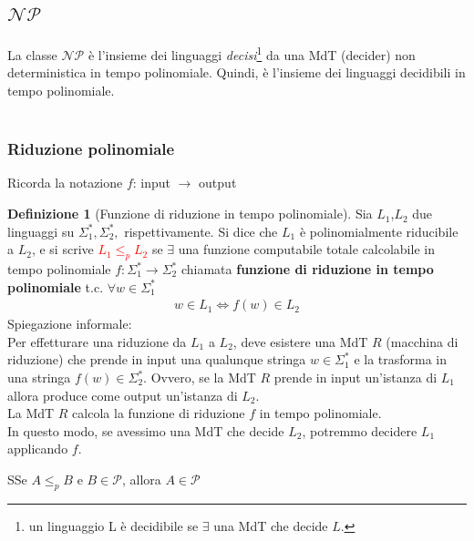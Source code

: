\documentclass{article}  %
\theoremstyle{definition}
\newtheorem{definition}{Definizione}[section]
\begin{document}
\subsection{$\mathcal{NP}$}
La classe $\mathcal{NP}$ è l'insieme dei linguaggi \textit{decisi}\footnote{un linguaggio L è decidibile se $\exists$ una MdT che decide $L$.} da una MdT (decider) non deterministica in tempo polinomiale.
Quindi, è l'insieme dei linguaggi decidibili in tempo polinomiale. \\ \\




















\subsubsection{Riduzione polinomiale}
Ricorda la notazione $f$: input $\rightarrow$ output
\begin{definition}[Funzione di riduzione in tempo polinomiale]
	Sia $L_1$,$L_2$ due linguaggi su $\Sigma_{1}^*,\Sigma_{2}^*,$ rispettivamente.
	Si dice che $L_1$ è polinomialmente riducibile a $L_2$, e si scrive \textcolor{red}{$L_1 \leq_{p} L_2$} se $\exists$ una funzione computabile totale calcolabile in tempo polinomiale
	$f:\Sigma^*_1 \rightarrow \Sigma^*_2$ chiamata \textbf{funzione di riduzione in tempo polinomiale} t.c. $\forall{w}\in \Sigma^*_1$
	\begin{align*}
		w \in L_1 \iff f(w) \in L_2
	\end{align*}
	Spiegazione informale:\\
	Per effetturare una riduzione da $L_1$ a $L_2$, deve esistere una MdT $R$ (macchina di riduzione) che prende in input
	una qualunque stringa $w \in \Sigma^*_1$ e la trasforma in una stringa $f(w) \in \Sigma^*_2$.
	Ovvero, se la MdT $R$ prende in input un'istanza di $L_1$ allora produce come output un'istanza di $L_2$. \\
	La MdT $R$ calcola la funzione di riduzione $f$ in tempo polinomiale. \\
	In questo modo, se avessimo una MdT che decide $L_2$, potremmo decidere $L_1$ applicando $f$.
\end{definition}
\begin{theorem}{5.1}
	SSe $A \leq_p B$ e $B \in \mathcal{P}$, allora $A \in \mathcal{P}$
\end{theorem}
\end{document}
